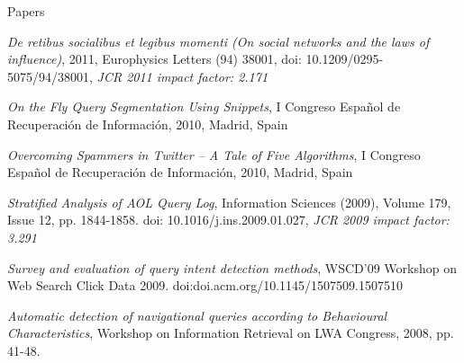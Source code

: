 \begin{rubric}{Papers}

  \entry*[2011]
  \emph{De retibus socialibus et legibus momenti (On social networks and the laws of influence)}, 2011, Europhysics Letters (94) 38001, doi: 10.1209/0295-5075/94/38001, \emph{JCR 2011 impact factor: 2.171}

  \entry*[2010]
  \emph{On the Fly Query Segmentation Using Snippets},  I Congreso Español de Recuperación de Información, 2010, Madrid, Spain

  \entry*
  \emph{Overcoming Spammers in Twitter -- A Tale of Five Algorithms},  I Congreso Español de Recuperación de Información, 2010, Madrid, Spain


  \entry*[2009]
  \emph{Stratified Analysis of AOL Query Log},  Information Sciences (2009), Volume 179, Issue 12, pp. 1844-1858. doi: 10.1016/j.ins.2009.01.027, \emph{JCR 2009 impact factor: 3.291}

  \entry*
  \emph{Survey and evaluation of query intent detection methods}, WSCD'09 Workshop on Web Search Click Data 2009. doi:doi.acm.org/10.1145/1507509.1507510

  \entry*[2008]
  \emph{Automatic detection of navigational queries according to Behavioural Characteristics}, Workshop on Information Retrieval on LWA Congress, 2008, pp. 41-48.

\end{rubric}
